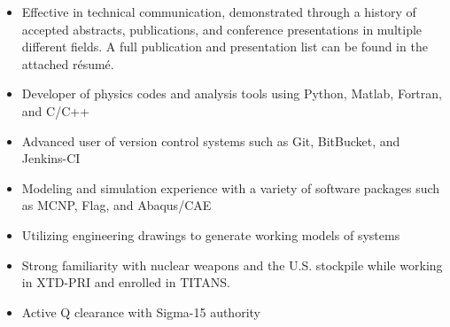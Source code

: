 \begin{center}
\begin{minipage}{\textwidth}
\begin{itemize}[leftmargin=.45in,rightmargin=.45in,itemsep=1.6mm]

		
	\item Effective in technical communication, demonstrated through a history of accepted abstracts, publications, and conference presentations in multiple different fields. A full publication and presentation list can be found in the attached r\'{e}sum\'{e}.
	

	\item Developer of physics codes and analysis tools using Python, Matlab, Fortran, and C/C++
	\item Advanced user of version control systems such as Git, BitBucket, and Jenkins-CI
	\item Modeling and simulation experience with a variety of software packages such as MCNP, Flag, and Abaqus/CAE
	\item Utilizing engineering drawings to generate working models of systems 
	\item Strong familiarity with nuclear weapons and the U.S. stockpile while working in XTD-PRI and enrolled in \textsc{TITANS}.
	\item Active Q clearance with Sigma-15 authority

  \end{itemize} 


\end{minipage}
\end{center}

